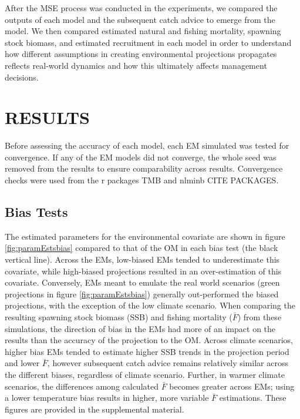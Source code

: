 \documentclass[
  12pt,
]{article}
\begin{document}
After the MSE process was conducted in the experiments, we compared the outputs of each model and the subsequent catch advice to emerge from the model. We then compared estimated natural and fishing mortality, spawning stock biomass, and estimated recruitment in each model in order to understand how different assumptions in creating environmental projections propagates reflects real-world dynamics and how this ultimately affects management decisions.

\section{RESULTS}\label{results}

Before assessing the accuracy of each model, each EM simulated was tested for convergence. If any of the EM models did not converge, the whole seed was removed from the results to ensure comparability across results. Convergence checks were used from the r packages TMB and nlminb CITE PACKAGES.

\subsection{Bias Tests}\label{bias-tests}

The estimated parameters for the environmental covariate are shown in figure \ref{fig:paramEstsbias} compared to that of the OM in each bias test (the black vertical line). Across the EMs, low-biased EMs tended to underestimate this covariate, while high-biased projections resulted in an over-estimation of this covariate. Conversely, EMs meant to emulate the real world scenarios (green projections in figure \ref{fig:paramEstsbias}) generally out-performed the biased projections, with the exception of the low climate scenario. When comparing the resulting spawning stock biomass (SSB) and fishing mortality (\(\bar{F}\)) from these simulations, the direction of bias in the EMs had more of an impact on the results than the accuracy of the projection to the OM. Across climate scenarios, higher bias EMs tended to estimate higher SSB trends in the projection period and lower \(\bar{F}\), however subsequent catch advice remains relatively similar across the different biases, regardless of climate scenario. Further, in warmer climate scenarios, the differences among calculated \(\bar{F}\) becomes greater across EMs; using a lower temperature bias results in higher, more variable \(\bar{F}\) estimations. These figures are provided in the supplemental material.
\end{document}
